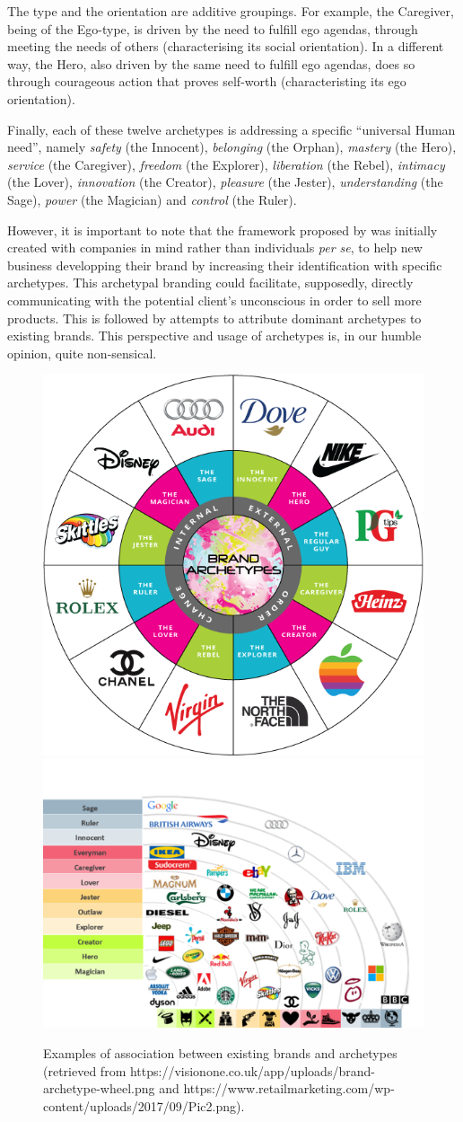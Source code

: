 \documentclass[]{book}
\begin{document}
The type and the orientation are additive groupings. For example, the Caregiver, being of the Ego-type, is driven by the need to fulfill ego agendas, through meeting the needs of others (characterising its social orientation). In a different way, the Hero, also driven by the same need to fulfill ego agendas, does so through courageous action that proves self-worth (characteristing its ego orientation).

Finally, each of these twelve archetypes is addressing a specific ``universal Human need'', namely \emph{safety} (the Innocent), \emph{belonging} (the Orphan), \emph{mastery} (the Hero), \emph{service} (the Caregiver), \emph{freedom} (the Explorer), \emph{liberation} (the Rebel), \emph{intimacy} (the Lover), \emph{innovation} (the Creator), \emph{pleasure} (the Jester), \emph{understanding} (the Sage), \emph{power} (the Magician) and \emph{control} (the Ruler).

However, it is important to note that the framework proposed by \citet{mark2001hero} was initially created with companies in mind rather than individuals \emph{per se}, to help new business developping their brand by increasing their identification with specific archetypes. This archetypal branding could facilitate, supposedly, directly communicating with the potential client's unconscious in order to sell more products. This is followed by attempts to attribute dominant archetypes to existing brands. This perspective and usage of archetypes is, in our humble opinion, quite non-sensical.

\begin{figure}

{\centering \includegraphics[width=0.49\linewidth]{img/brand_archetypes1} \includegraphics[width=0.49\linewidth]{img/brand_archetypes2} 

}

\caption{Examples of association between existing brands and archetypes (retrieved from https://visionone.co.uk/app/uploads/brand-archetype-wheel.png and https://www.retailmarketing.com/wp-content/uploads/2017/09/Pic2.png).}\label{fig:unnamed-chunk-7}
\end{figure}
\end{document}
